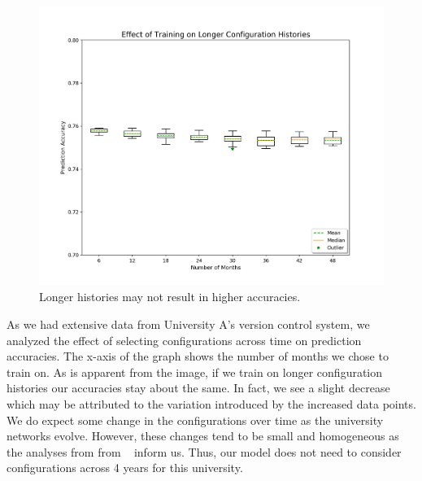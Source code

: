 \begin{figure}[H]
	\centering
	\includegraphics[width=\textwidth]{time.png}
	\caption{Longer histories may not result in higher accuracies.}
\end{figure}

As we had extensive data from University A's version control system, we analyzed the effect of selecting configurations across time on prediction accuracies. The x-axis of the graph shows the number of months we chose to train on. As is apparent from the image, if we train on longer configuration histories our accuracies stay about the same. In fact, we see a slight decrease which may be attributed to the variation introduced by the increased data points. We do expect some change in the configurations over time as the university networks evolve. However, these changes tend to be small and homogeneous as the analyses from from ~\cite{Kim} inform us. Thus, our model does not need to consider configurations across 4 years for this university.

